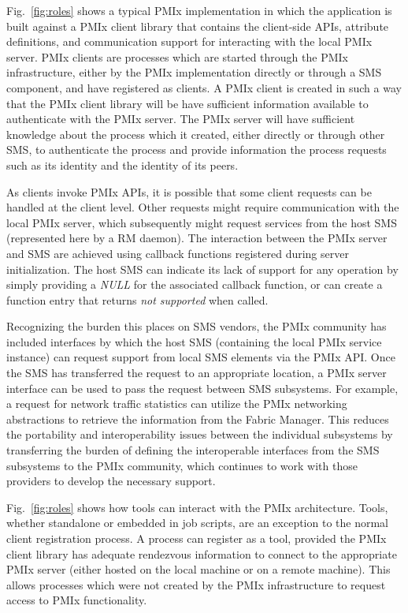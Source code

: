 Fig.~\ref{fig:roles} shows a typical \ac{PMIx} implementation in which the application is
built against a \ac{PMIx} client library that contains the client-side \acp{API},
attribute definitions, and communication support for interacting with the local \ac{PMIx} server.
\ac{PMIx} clients are processes which are started through the \ac{PMIx} infrastructure,
either by the PMIx implementation directly or through a \ac{SMS} component, and have registered
as clients.  A \ac{PMIx} client
is created in such a way that the \ac{PMIx} client library
will be have sufficient information available to
authenticate with the \ac{PMIx} server.
The \ac{PMIx} server will have sufficient knowledge about the
process which it created, either directly or through other \ac{SMS}, to authenticate the
process and provide information the process requests such as its identity and the
identity of its peers.

As clients invoke \ac{PMIx} \acp{API}, it is possible that some client requests can
be handled at the client level.  Other requests might require communication with the
local \ac{PMIx} server, which subsequently might request services from the host \ac{SMS}
(represented here by a \ac{RM} daemon).
The interaction between the \ac{PMIx} server and \ac{SMS} are
achieved using callback functions registered during server initialization.
The host \ac{SMS} can indicate its lack of support for any operation by simply providing a \textit{NULL} for the associated callback function, or can create a function entry that returns \textit{not supported} when called.

Recognizing the burden this places on SMS vendors, the PMIx community has included interfaces by
which the host \ac{SMS} (containing the local PMIx service instance) can request support from local \ac{SMS} elements via the PMIx API.  Once the \ac{SMS} has transferred the request to
an appropriate location, a \ac{PMIx} server interface can be used to pass the request
between \ac{SMS} subsystems.
For example, a request for network traffic statistics can utilize the
PMIx networking abstractions to retrieve the information from the Fabric Manager.
This reduces the portability and
interoperability issues between the individual subsystems by transferring the burden of defining the
interoperable interfaces from the \ac{SMS} subsystems to the \ac{PMIx} community, which continues
to work with those providers to develop the necessary support.

Fig.~\ref{fig:roles} shows how tools can interact with the \ac{PMIx} architecture.
Tools, whether standalone or embedded in job scripts, are an exception to
the normal client registration process.   A process can register as a tool, provided
the \ac{PMIx} client library has adequate rendezvous information to connect to the appropriate
\ac{PMIx} server (either hosted on the local machine or on a remote machine).  This allows processes
which were not created by the PMIx infrastructure to request access to PMIx functionality.


